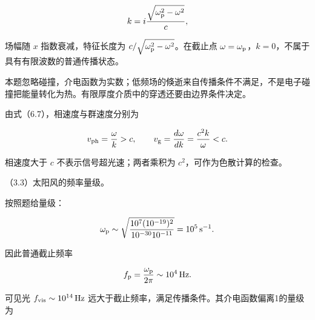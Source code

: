 \documentclass[12pt,a4paper,fontset=fandol]{ctexart}
\begin{document}
\[
k=i\frac{\sqrt{\omega_{\rm p}^2-\omega^2}}c,
\]

场幅随 \(x\) 指数衰减，特征长度为
\(c/\sqrt{\omega_{\rm p}^2-\omega^2}\)。在截止点
\(\omega=\omega_{\rm p}\)，\(k=0\)，不属于具有有限波数的普通传播状态。

本题忽略碰撞，介电函数为实数；低频场的倏逝来自传播条件不满足，不是电子碰撞把能量转化为热。有限厚度介质中的穿透还要由边界条件决定。

\begin{center}
\begin{minipage}{\linewidth}
\centering\begingroup
{}
\ifdim\wd\diagrambox>.88\linewidth
\sbox{\diagrambox}{\resizebox{.88\linewidth}{!}{\usebox{\diagrambox}}}
\fi
\ifdim\ht\diagrambox>.29\textheight
\resizebox{!}{.29\textheight}{\usebox{\diagrambox}}
\else\usebox{\diagrambox}\fi
\par{}
\endgroup\end{minipage}
\end{center}

由式（6.7），相速度与群速度分别为

\[
v_{\rm ph}=\frac{\omega}{k}>c,\qquad
v_{\rm g}=\frac{d\omega}{dk}=\frac{c^2k}{\omega}<c.
\]

相速度大于 \(c\) 不表示信号超光速；两者乘积为
\(c^2\)，可作为色散计算的检查。

（3.3）太阳风的频率量级。

按照题给量级：

\[
\omega_{\rm p}\sim
\sqrt{\frac{10^7(10^{-19})^2}{10^{-30}10^{-11}}}
=10^5\,\mathrm{s^{-1}}.
\]

因此普通截止频率

\[
f_{\rm p}=\frac{\omega_{\rm p}}{2\pi}\sim10^4\,\mathrm{Hz}.
\]

可见光 \(f_{\rm vis}\sim10^{14}\,\mathrm{Hz}\)
远大于截止频率，满足传播条件。其介电函数偏离1的量级为
\end{document}
